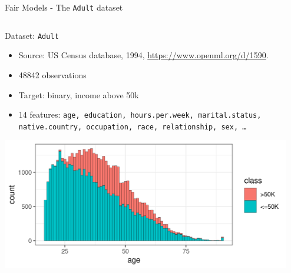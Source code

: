\documentclass[11pt,compress,t,notes=noshow,xcolor=table]{beamer}
\begin{document}


\begin{vbframe}{Fair Models - The \texttt{Adult} dataset}

\begin{columns}
\begin{column}{0.5\textwidth}
Dataset: \texttt{Adult}
\begin{itemize}
  \scriptsize
  \item  Source: US Census database, 1994, \url{https://www.openml.org/d/1590}.
  \item 48842 observations
  \item Target: binary, income above 50k
  \item 14 features: \texttt{age, education, hours.per.week, marital.status, native.country, occupation, race, relationship, sex, \ldots}
\end{itemize}
\includegraphics[width=0.99\textwidth]{slides/11-multicrit/figure_man/dataset_adult_age_sex.png}
\end{column}%
\begin{column}{0.5\textwidth}


\end{column}
\end{columns}
\end{vbframe}
\end{document}
